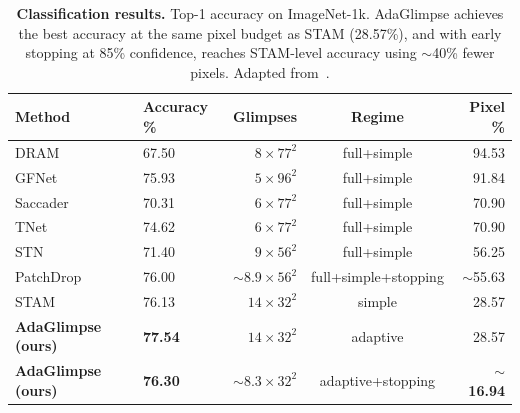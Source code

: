 \begin{table}[th]
    \caption[Classification results on ImageNet-1k]{\textbf{Classification results.} Top-1 accuracy on ImageNet-1k. AdaGlimpse achieves the best accuracy at the same pixel budget as STAM (28.57\%), and with early stopping at 85\% confidence, reaches STAM-level accuracy using $\sim$40\% fewer pixels. Adapted from~.}
    \label{tab:adaglimpse-classification}
    \begin{center}
    \begin{small}
    \begin{tabular}{l@{\hskip12pt}l@{\hskip12pt}r@{\hskip12pt}c@{\hskip12pt}r}
    \toprule
    Method & Accuracy \% & Glimpses & Regime & Pixel \% \\
    \midrule
    DRAM & 67.50 & $8 \times 77^2$ & full+simple & 94.53 \\
    GFNet & 75.93 & $5 \times 96^2$ & full+simple & 91.84 \\
    Saccader & 70.31 & $6 \times 77^2$ & full+simple & 70.90 \\
    TNet & 74.62 & $6 \times 77^2$ & full+simple & 70.90 \\
    STN & 71.40 & $9 \times 56^2$ & full+simple & 56.25 \\
    PatchDrop & 76.00 & $\sim8.9 \times 56^2$ & full+simple+stopping & $\sim$55.63 \\
    STAM & 76.13 & $14 \times 32^2$ & simple & 28.57 \\
    \textbf{AdaGlimpse (ours)} & \textbf{77.54} & $14 \times 32^2$ & adaptive & 28.57 \\
    \textbf{AdaGlimpse (ours)} & \textbf{76.30} & $\sim8.3 \times 32^2$ & adaptive+stopping & $\sim$\textbf{16.94} \\
    \bottomrule
    \end{tabular}
    \end{small}
    \end{center}
    \end{table}
